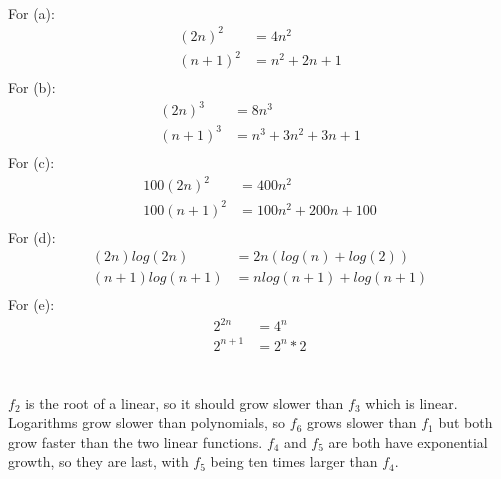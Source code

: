 \documentclass{assignment}
\begin{document}
\bigskip
\begin{problemlist}
\pbitem
\begin{problem}
\end{problem}
\begin{answer}
\\
For (a):\\
\begin{align*}
  (2n)^2&=4n^2\\
  (n+1)^2&=n^2+2n+1\\
\end{align*}
For (b):\\
\begin{align*}
  (2n)^3&=8n^3\\
  (n+1)^3&=n^3+3n^2+3n+1\\
\end{align*}
For (c):\\
\begin{align*}
  100(2n)^2&=400n^2\\
  100(n+1)^2&=100n^2+200n+100\\
\end{align*}
For (d):\\
\begin{align*}
  (2n)log(2n)&=2n(log(n)+log(2))\\
  (n+1)log(n+1)&=nlog(n+1)+log(n+1)\\
\end{align*}
For (e):\\
\begin{align*}
  2^{2n}&=4^n\\
  2^{n+1}&=2^n*2\\
\end{align*}
\end{answer}
\pbitem
\begin{problem}
\end{problem}
\begin{answer}
\\
$f_2$ is the root of a linear, so it should grow slower than $f_3$ which is linear. Logarithms grow slower than polynomials, so $f_6$ grows slower than $f_1$ but both grow faster than the two linear functions. $f_4$ and $f_5$ are both have exponential growth, so they are last, with $f_5$ being ten times larger than $f_4$.\\
\end{answer}
\pbitem
\begin{problem}
\end{problem}
\begin{answer}
\\

\end{answer}
\end{problemlist}
\end{document}
